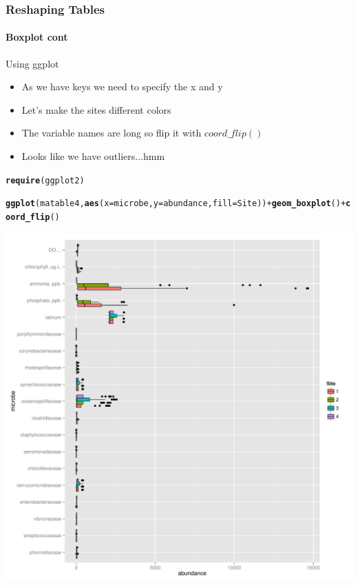 \documentclass[12pt]{beamer}\usepackage[]{graphicx}\usepackage[]{color}
\makeatletter
\newcommand{\hlopt}[1]{\textcolor[rgb]{0,0,0}{#1}}%
\newcommand{\hlstd}[1]{\textcolor[rgb]{0.345,0.345,0.345}{#1}}%
\newcommand{\hlkwc}[1]{\textcolor[rgb]{0.333,0.667,0.333}{#1}}%
\newcommand{\hlkwd}[1]{\textcolor[rgb]{0.737,0.353,0.396}{\textbf{#1}}}%
\newenvironment{kframe}{%
 \def\at@end@of@kframe{}%
 \ifinner\ifhmode%
  \def\at@end@of@kframe{\end{minipage}}%
  \begin{minipage}{\columnwidth}%
 \fi\fi%
 \def\FrameCommand##1{\hskip\@totalleftmargin \hskip-\fboxsep
 \colorbox{shadecolor}{##1}\hskip-\fboxsep
     \hskip-\linewidth \hskip-\@totalleftmargin \hskip\columnwidth}%
 \MakeFramed {\advance\hsize-\width
   \@totalleftmargin\z@ \linewidth\hsize
   \@setminipage}}%
 {\par\unskip\endMakeFramed%
 \at@end@of@kframe}
\newenvironment{knitrout}{}{} %
\makeatother
\begin{document}
\begin{frame}[fragile]
  \frametitle{Reshaping Tables}
  \framesubtitle{Boxplot cont}
  \begin{block}{Using ggplot}
  \begin{itemize}
  \item As we have keys we need to specify the x and y
  \item Let's make the sites different colors
  \item The variable names are long so flip it with $coord\_flip()$
  \item Looks like we have outliers...hmm
  \end{itemize}
  \end{block}

\begin{knitrout}
\color{fgcolor}\begin{kframe}
\begin{alltt}
\hlkwd{require}\hlstd{(ggplot2)}
\end{alltt}


{\ttfamily\noindent\itshape\color{messagecolor}{\#\# Loading required package: ggplot2}}\begin{alltt}
 \hlkwd{ggplot}\hlstd{(matable4,}\hlkwd{aes}\hlstd{(}\hlkwc{x}\hlstd{=microbe,}\hlkwc{y}\hlstd{=abundance,}\hlkwc{fill}\hlstd{=Site))} \hlopt{+} \hlkwd{geom_boxplot}\hlstd{()} \hlopt{+}  \hlkwd{coord_flip}\hlstd{()}
\end{alltt}


{\ttfamily\noindent\color{warningcolor}{\#\# Warning: Removed 24 rows containing non-finite values (stat\_boxplot).}}\end{kframe}
\includegraphics[width=.85\linewidth]{figure/chunk10iv-1} 

\end{knitrout}
\end{frame}  
\end{document}
